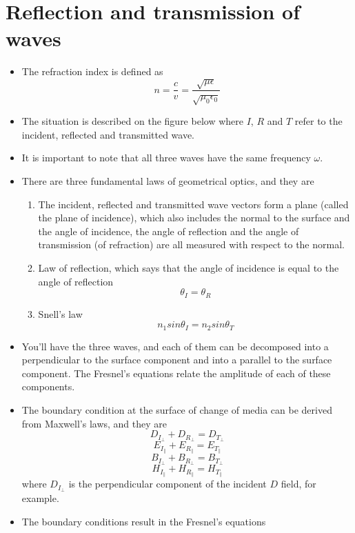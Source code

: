 \documentclass[oneside, 10pt, notitlepage]{book}
\begin{document}
\section{Reflection and transmission of waves}
\begin{itemize}
    \item The refraction index is defined as
    $$n = \frac{c}{v} = \frac{\sqrt{\mu \epsilon}}{\sqrt{\mu_ 0 \epsilon_0}}$$
    \item The situation is described on the figure below
    where $I$, $R$ and $T$ refer to the incident, reflected and transmitted wave.
    \item It is important to note that all three waves have the same frequency $\omega$.
    \item There are three fundamental laws of geometrical optics, and they are
    \begin{enumerate}
        \item The incident, reflected and transmitted wave vectors form a plane (called the plane of incidence), which also includes the normal to the surface and the angle of incidence, the angle of reflection and the angle of transmission (of refraction) are all measured with respect to the normal.
        \item Law of reflection, which says that the angle of incidence is equal to the angle of reflection
        $$\theta_I = \theta_R$$
        \item Snell's law 
        $$n_1 sin\theta_I = n_2 sin\theta_T$$
    \end{enumerate}
    \item You'll have the three waves, and each of them can be decomposed into a perpendicular to the surface component and into a parallel to the surface component. The Fresnel's equations relate the amplitude of each of these components.
    \item The boundary condition at the surface of change of media can be derived from Maxwell's laws, and they are
    $$D_{I_{\perp}} + D_{R_{\perp}}= D_{T_{\perp}}$$
    $$E_{I_{\parallel}} + E_{R_{\parallel}} = E_{T_{\parallel}}$$
    $$B_{I_{\perp}} + B_{R_{\perp}} = B_{T_{\perp}}$$
    $$H_{I_{\parallel}} + H_{R_{\parallel}} = H_{T_{\parallel}}$$
    where $D_{I_{\perp}}$ is the perpendicular component of the incident $D$ field, for example.
    \item The boundary conditions result in the Fresnel's equations

\end{itemize}
\end{document}
